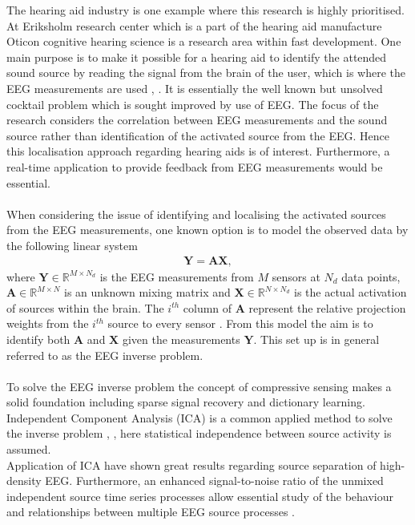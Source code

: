The hearing aid industry is one example where this research is highly prioritised. At Eriksholm research center which is a part of the hearing aid manufacture Oticon cognitive hearing science is a research area within fast development. One main purpose is to make it possible for a hearing aid to identify the attended sound source by reading the signal from the brain of the user, which is where the EEG measurements are used \cite{Emina2019}, \cite{Bech2018}. It is essentially the well known but unsolved cocktail problem which is sought improved by use of EEG. The focus of the research considers the correlation between EEG measurements and the sound source rather than identification of the activated source from the EEG. Hence this localisation approach regarding hearing aids is of interest. Furthermore, a real-time application to provide feedback from EEG measurements would be essential. 
\\
\\
When considering the issue of identifying and localising the activated sources from the EEG measurements, one known option is to model the observed data by the following linear system 
\begin{align*}
\mathbf{Y} = \mathbf{AX},
\end{align*}
where $\mathbf{Y} \in \mathbb{R}^{M\times N_d}$ is the EEG measurements from $M$ sensors at $N_d$ data points, $\mathbf{A} \in \mathbb{R}^{M \times N}$ is an unknown mixing matrix and $\mathbf{X} \in \mathbb{R}^{N \times N_d}$ is the actual activation of sources within the brain. The $i^{th}$ column of $\textbf{A}$ represent the relative projection weights from the $i^{th}$ source to every sensor \cite{phd2015}. From this model the aim is to identify both $\textbf{A}$ and $\textbf{X}$ given the measurements $\textbf{Y}$. This set up is in general referred to as the EEG inverse problem.  
\\
\\
To solve the EEG inverse problem the concept of compressive sensing makes a solid foundation including sparse signal recovery and dictionary learning. Independent Component Analysis (ICA) is a common applied method to solve the inverse problem \cite{Scott1996}, \cite{Scott1997}, here statistical independence between source activity is assumed. 
\\
Application of ICA have shown great results regarding source separation of high-density EEG. Furthermore, an enhanced signal-to-noise ratio of the unmixed independent source time series processes allow essential study of the behaviour and relationships between multiple EEG source processes \cite{Arnaud2012}. 
